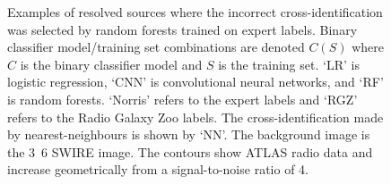 \documentclass[fleqn,usenatbib,usedcolumn]{mnras}
\begin{document}
\begin{figure}
        \caption{\label{fig:examples} Examples of resolved sources where the incorrect cross-identification was selected by random forests trained on expert labels. Binary classifier model/training set combinations are denoted $C(S)$ where $C$ is the binary classifier model and $S$ is the training set. `LR' is logistic regression, `CNN' is convolutional neural networks, and `RF' is random forests. `Norris' refers to the expert labels and `RGZ' refers to the Radio Galaxy Zoo labels. The cross-identification made by nearest-neighbours is shown by `NN'. The background image is the \unit{3.6}{\micro\meter} SWIRE image. The contours show ATLAS radio data and increase geometrically from a signal-to-noise ratio of 4.}
    \end{figure}
\end{document}
